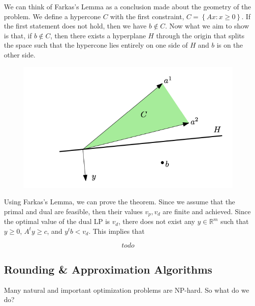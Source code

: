 \documentclass[../notes.tex]{subfiles}
\begin{document}
\begin{blockquote}
We can think of Farkas's Lemma as a conclusion made about the geometry of the problem.
We define a hypercone $ C$ with the first constraint, $C = \left\{ Ax: x \ge 0 \right\} $.
If the first statement does not hold, then we have $ b \notin C $.
Now what we aim to show is that, if $ b \notin C $, then there exists a hyperplane $ H $ through the origin that splits the space such that the hypercone lies entirely on one side of $ H $ and $ b $ is on the other side.

\begin{figure}[H]
    \centering
    \includegraphics[width=0.8\linewidth]{img/image_2023-04-03-15-54-43.png}
\end{figure}
    
\end{blockquote}

Using Farkas's Lemma, we can prove the theorem.
Since we assume that the primal and dual are feasible, then their values $ v_p, v_d $ are finite and achieved. 
Since the optimal value of the dual LP is $ v_d $, there does not exist any $ y \in \mathbb{R}^m$ such that $ y \ge 0  $, $ A^ty \ge c $, and $ y^tb < v_d$. This implies that 

\begin{equation}
    todo
\end{equation}









\subsection{Rounding \& Approximation Algorithms}

Many natural and important optimization problems are NP-hard. So what do we do? 
\end{document}
